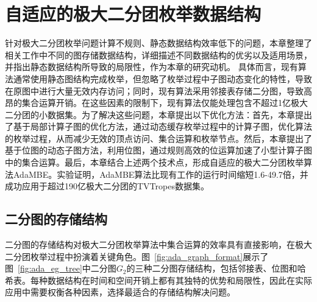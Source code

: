 \chapter{自适应的极大二分团枚举数据结构}
\label{ch:adapt_mbe}

针对极大二分团枚举问题计算不规则、静态数据结构效率低下的问题，本章整理了相关工作中不同的图存储数据结构，详细描述不同数据结构的优劣以及适用场景，并指出静态数据结构所导致的局限性，作为本章的研究动机。
具体而言，现有算法通常使用静态图结构完成枚举，但忽略了枚举过程中子图动态变化的特性，导致在原图中进行大量无效内存访问；同时，现有算法采用邻接表存储二分图，导致高昂的集合运算开销。在这些因素的限制下，现有算法仅能处理包含不超过1亿极大二分团的小数据集。为了解决这些问题，本章提出以下优化方法：首先，本章提出了基于局部计算子图的优化方法，通过动态缓存枚举过程中的计算子图，优化算法的枚举过程，从而减少无效的顶点访问、集合运算和枚举节点。然后，本章提出了基于位图的动态子图方法，利用位图，通过规则高效的位运算加速了小型计算子图中的集合运算。最后，本章结合上述两个技术点，形成自适应的极大二分团枚举算法AdaMBE。实验证明，AdaMBE算法比现有工作的运行时间缩短1.6-49.7倍，并成功应用于超过190亿极大二分团的TVTropes数据集。






\section{二分图的存储结构}
\label{subsec:ada_representation}

二分图的存储结构对极大二分团枚举算法中集合运算的效率具有直接影响，在极大二分团枚举过程中扮演着关键角色。图~\ref{fig:ada_graph_format}展示了图~\ref{fig:ada_eg_tree}中二分图$G_2$的三种二分图存储结构，包括邻接表、位图和哈希表。每种数据结构在时间和空间开销上都有其独特的优势和局限性，因此在实际应用中需要权衡各种因素，选择最适合的存储结构解决问题。

